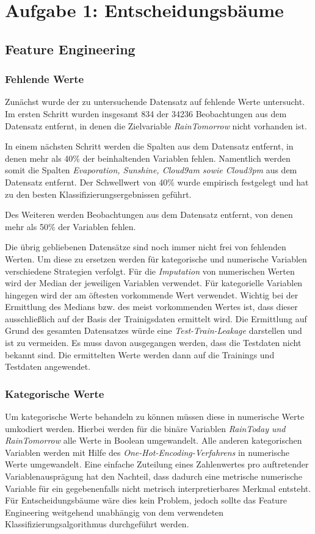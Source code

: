 \section{Aufgabe 1: Entscheidungsbäume}
\subsection{Feature Engineering}
\subsubsection{Fehlende Werte}

Zunächst wurde der zu untersuchende Datensatz auf fehlende Werte untersucht. Im ersten Schritt wurden insgesamt 834 der 34236 Beobachtungen aus dem Datensatz entfernt, in denen die Zielvariable \emph{RainTomorrow} nicht vorhanden ist.


In einem nächsten Schritt werden die Spalten aus dem Datensatz entfernt, in denen mehr als 40\% der beinhaltenden Variablen fehlen. Namentlich werden somit die Spalten \emph{Evaporation, Sunshine, Cloud9am sowie Cloud3pm} aus dem Datensatz entfernt. Der Schwellwert von 40\% wurde empirisch festgelegt und hat zu den besten Klassifizierungsergebnissen geführt.

Des Weiteren werden Beobachtungen aus dem Datensatz entfernt, von denen mehr als 50\% der Variablen fehlen.

Die übrig gebliebenen Datensätze sind noch immer nicht frei von fehlenden Werten. Um diese zu ersetzen werden für kategorische und numerische Variablen verschiedene Strategien verfolgt. Für die \emph{Imputation} von numerischen Werten wird der Median der jeweiligen Variablen verwendet. Für kategorielle Variablen hingegen wird der am öftesten vorkommende Wert verwendet. Wichtig bei der Ermittlung des Medians bzw. des meist vorkommenden Wertes ist, dass dieser ausschließlich auf der Basis der Trainigsdaten ermittelt wird. Die Ermittlung auf Grund des gesamten Datensatzes würde eine \emph{Test-Train-Leakage} darstellen und ist zu vermeiden. Es muss davon ausgegangen werden, dass die Testdaten nicht bekannt sind. Die ermittelten Werte werden dann auf die Trainings und Testdaten angewendet.

\subsubsection{Kategorische Werte}

Um kategorische Werte behandeln zu können müssen diese in numerische Werte umkodiert werden. Hierbei werden für die binäre Variablen \emph{ RainToday und RainTomorrow} alle Werte in Boolean umgewandelt. Alle anderen kategorischen Variablen werden mit Hilfe des \emph{One-Hot-Encoding-Verfahrens} in numerische Werte umgewandelt. Eine einfache Zuteilung eines Zahlenwertes pro auftretender Variablenausprägung hat den Nachteil, dass dadurch eine metrische numerische Variable für ein gegebenenfalls nicht metrisch interpretierbares Merkmal entsteht. Für Entscheidungsbäume wäre dies kein Problem, jedoch sollte das Feature Engineering weitgehend unabhängig von dem verwendeten Klassifizierungsalgorithmus durchgeführt werden. 

